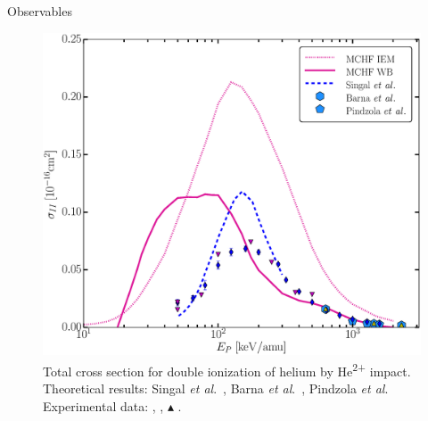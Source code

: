 \documentclass[letterpaper, 12 pt]{report}
\begin{document}
\begin{chapter}{Observables \label{chap:p-he2p-he}}
\begin{figure}[htp]
   \centering
   \includegraphics[width = \linewidth]{./images/he2phe/he2phe-II.eps}
   \caption[Total cross section for double ionization of helium by He\textsuperscript{2+}
            impact.]{Total cross section for double ionization of helium by He\textsuperscript{2+}
            impact. Theoretical results: Singal \textit{et al}.\ \cite{SL-91}, Barna \textit{et al}.\
            \cite{BTB-05}, Pindzola \textit{et al}.\ \cite{PRC-07}
            Experimental data: {\color{blue}{$\blacklozenge$}} \cite{SG85},
            {\color{RedViolet}{$\blacktriangledown$}} \cite{Dubois87},
            {\color{GreenYellow}$\blacktriangle$} \cite{KAH84}. \label{fig:he2phe-ii}}
\end{figure}


\end{chapter}
\end{document}
